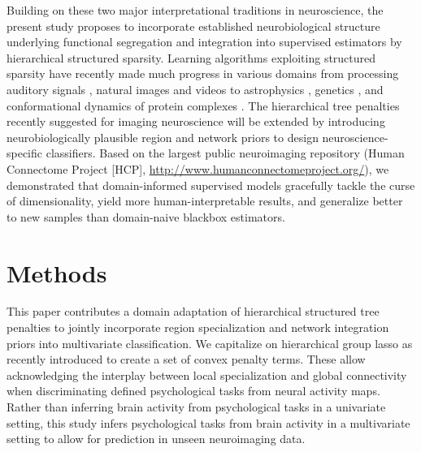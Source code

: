 \documentclass{article}
\begin{document}
Building on these two major interpretational traditions in neuroscience,
the present study proposes to incorporate
established neurobiological structure underlying
functional segregation and integration
into supervised estimators
by hierarchical structured sparsity.
%
Learning algorithms
exploiting structured sparsity 
have recently made much progress in various domains
from processing auditory signals \cite{daudet2004sparse},
natural images \cite{harzallah2009combining} and
videos \cite{kang2015structured}
to
astrophysics \cite{vinci2014estimating},
genetics \cite{kim2012tree},
and
conformational dynamics of protein complexes \cite{jenatton2009structured}.
%
The hierarchical tree penalties recently suggested for imaging neuroscience
\cite{jenatton2011multi} will be extended
by introducing neurobiologically plausible region and network priors
to design neuroscience-specific classifiers.
%
Based on the largest public neuroimaging repository
(Human Connectome Project [HCP], \url{http://www.humanconnectomeproject.org/}),
we demonstrated that domain-informed supervised models
gracefully tackle the curse of dimensionality,
yield more human-interpretable results,
and generalize better to new samples
than domain-naive blackbox estimators.

\section{Methods}
This paper contributes a domain adaptation of hierarchical structured
tree penalties to jointly incorporate region 
specialization and network integration priors into multivariate 
classification.
We capitalize on hierarchical group lasso as recently introduced
\cite{jenatton2011multi} to create a set of convex penalty terms.
These allow acknowledging the interplay between local specialization and 
global connectivity when discriminating defined psychological tasks
from neural activity maps.
Rather than inferring brain activity from psychological tasks
in a univariate setting,
this study infers psychological tasks from brain activity
in a multivariate setting to allow for
prediction in unseen neuroimaging data.
%
\end{document}
